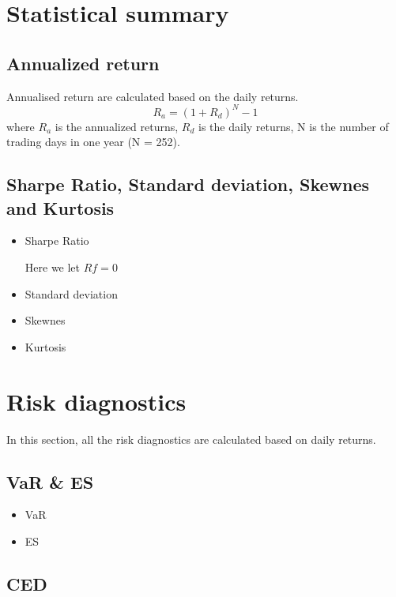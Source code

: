\documentclass[12pt]{article}
\begin{document}
\section{Statistical summary}

\subsection{Annualized return}

Annualised return are calculated based on the daily returns. 
\begin{equation}
R_a = (1+R_d)^{N} -1
\end{equation}
where $R_a$ is the annualized returns, $R_d$ is the daily returns, N is the number of trading days in one year (N = 252).

\subsection{Sharpe Ratio, Standard deviation, Skewnes and Kurtosis}

\begin{itemize}
\item Sharpe Ratio

Here we let $Rf = 0$
\item Standard deviation
\item Skewnes
\item Kurtosis
\end{itemize}




\section{Risk diagnostics}

In this section, all the risk diagnostics are calculated based on daily returns.

\subsection{VaR \& ES}

\begin{itemize}
\item VaR
\item ES
\end{itemize}



\subsection{CED}
\end{document}
